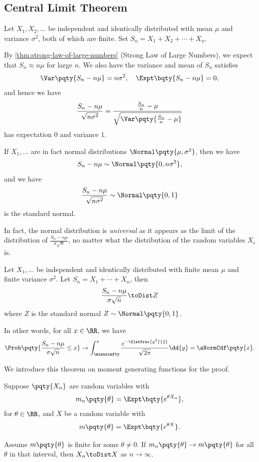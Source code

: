 \subsection{Central Limit Theorem}

Let \(X_1, X_2, \ldots\) be independent and identically distributed with mean \(\mu\) and variance \(\sigma^2\), both of which are finite. Set \(S_n = X_1 + X_2 + \cdots + X_n\).

By \autoref{thm:strong-law-of-large-numbers} (Strong Law of Large Numbers), we expect that \(S_n \approx n \mu\) for large \(n\). We also have the variance and mean of \(S_n\) satisfies
\[
    \Var\pqty{S_n - n \mu} = n \sigma^2, \quad \Expt\bqty{S_n - n \mu} = 0,
\]
and hence we have
\[
    \frac{S_n - n \mu}{\sqrt{n \sigma^2}} = \frac{\frac{S_n}{n} - \mu}{\sqrt{\Var\pqty{\frac{S_n}{n} - \mu}}}
\]
has expectation \(0\) and variance \(1\).

If \(X_1, \ldots\) are in fact normal distributions \(\Normal\pqty{\mu, \sigma^2}\), then we have
\[
    S_n - n \mu \sim \Normal\pqty{0, n \sigma^2},
\]
and we have
\[
    \frac{S_n - n \mu}{\sqrt{n \sigma^2}} \sim \Normal\pqty{0, 1}
\]
is the standard normal.

In fact, the normal distribution is \emph{universal} as it appears as the limit of the distribution of \(\frac{S_n - n \mu}{\sigma \sqrt{n}}\), no matter what the distribution of the random variables \(X_i\) is.

\begin{theorem}
    \label{thm:clt}%
    Let \(X_1, \ldots\) be independent and identically distributed with finite mean \(\mu\) and finite variance \(\sigma^2\). Let \(S_n = X_1 + \cdots + X_n\), then
    \[
        \frac{S_n - n \mu}{\sigma \sqrt{n}} \toDist Z
    \]
    where \(Z\) is the standard normal \(Z \sim \Normal\pqty{0, 1}\).

    In other words, for all \(x \in \RR\), we have
    \[
        \Prob\pqty{\frac{S_n - n \mu}{\sigma \sqrt{n}} \leq x} \to \int_{\minusinfty}^{x}  \frac{e^{- \flatfrac{y^2}{2}}}{\sqrt{2 \pi}} \dd{y} = \sNormCdf\pqty{x}.
    \]
\end{theorem}

We introduce this theorem on moment generating functions for the proof.

\begin{theorem}
    \label{thm:continuity-property-mgf}%
    Suppose \(\pqty{X_n}\) are random variables with
    \[
        m_n \pqty{\theta} = \Expt\bqty{e^{\theta X_n}},
    \]
    for \(\theta \in \RR\), and \(X\) be a random variable with
    \[
        m \pqty{\theta} = \Expt\bqty{e^{\theta X}}.
    \]

    Assume \(m\pqty{\theta}\) is finite for some \(\theta \neq 0\). If \(m_n \pqty{\theta} \to m\pqty{\theta}\) for all \(\theta\) in that interval, then \(X_n \toDist X\) as \(n \to \infty\).
\end{theorem}

